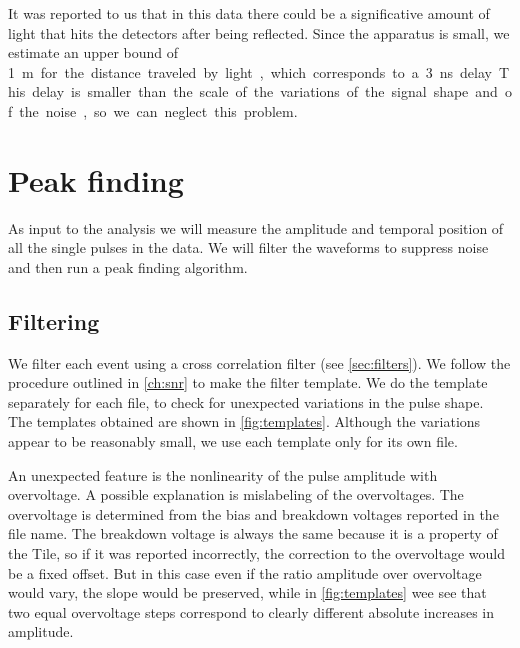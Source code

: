 It was reported to us that in this data there could be a significative amount
of light that hits the detectors after being reflected. Since the apparatus is
small, we estimate an upper bound of \SI{1}m for the distance traveled by
light, which corresponds to a \SI{3}{ns} delay. This delay is smaller than
the scale of the variations of the signal shape and of the noise, so we can
neglect this problem.

\section{Peak finding}

As input to the analysis we will measure the amplitude and temporal position of
all the single pulses in the data. We will filter the waveforms to suppress
noise and then run a peak finding algorithm.

\subsection{Filtering}
\label{sec:filtering}

We filter each event using a cross correlation filter (see
\autoref{sec:filters}). We follow the procedure outlined in \autoref{ch:snr} to
make the filter template. We do the template separately for each file, to check
for unexpected variations in the pulse shape. The templates obtained are shown
in \autoref{fig:templates}. Although the variations appear to be reasonably
small, we use each template only for its own file.


\begin{figure}
    
    
    
\end{figure}

An unexpected feature is the nonlinearity of the pulse amplitude with
overvoltage. A possible explanation is mislabeling of the overvoltages. The
overvoltage is determined from the bias and breakdown voltages reported in the
file name. The breakdown voltage is always the same because it is a property of
the Tile, so if it was reported incorrectly, the correction to the overvoltage
would be a fixed offset. But in this case even if the ratio amplitude over
overvoltage would vary, the slope would be preserved, while in
\autoref{fig:templates} wee see that two equal overvoltage steps correspond to
clearly different absolute increases in amplitude.

